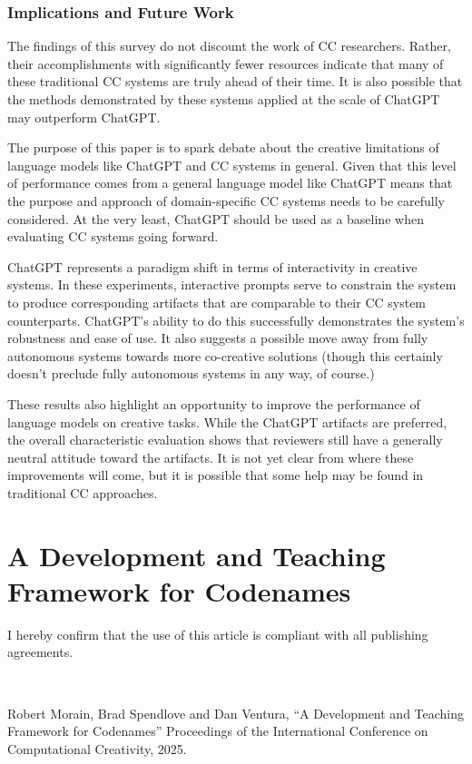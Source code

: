 \documentclass[phd,electronic,oneside,twosidetoc,letterpaper,chaptercenter,parttop,lof]{byumsphd}
\begin{document}
\subsection{Implications and Future Work}
The findings of this survey do not discount the work of CC researchers. 
Rather, their accomplishments with significantly fewer resources indicate that many of these traditional CC systems are truly ahead of their time.
It is also possible that the methods demonstrated by these systems applied at the scale of ChatGPT may outperform ChatGPT.

The purpose of this paper is to spark debate about the creative limitations of language models like ChatGPT and CC systems in general. 
Given that this level of performance comes from a general language model like ChatGPT means that the purpose and approach of domain-specific CC systems needs to be carefully considered. At the very least, ChatGPT should be used as a baseline when evaluating CC systems going forward.

ChatGPT represents a paradigm shift in terms of interactivity in creative systems. 
In these experiments, interactive prompts serve to constrain the system to produce corresponding artifacts that are comparable to their CC system counterparts. 
ChatGPT's ability to do this successfully demonstrates the system's robustness and ease of use. It also suggests a possible move away from fully autonomous systems towards more co-creative solutions (though this certainly doesn't preclude fully autonomous systems in any way, of course.)

These results also highlight an opportunity to improve the performance of language models on creative tasks.
While the ChatGPT artifacts are preferred, the overall characteristic evaluation shows that reviewers still have a generally neutral attitude toward the artifacts. 
It is not yet clear from where these improvements will come, but it is possible that some help may be found in traditional CC approaches. 




\chapter{A Development and Teaching Framework for Codenames} 
\label{chap:codenames} 

I hereby confirm that the use of this article is compliant with all publishing agreements.

\

\noindent
Robert Morain, Brad Spendlove and Dan Ventura, ``A Development and Teaching Framework for Codenames'' Proceedings of the International Conference on Computational Creativity, 2025.
\end{document}
